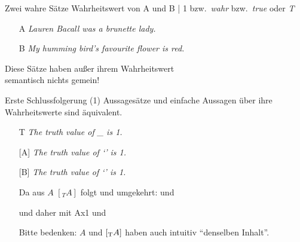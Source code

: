 \begin{frame}
  {Zwei wahre Sätze}
  \onslide<+->
  \onslide<+->
  Wahrheitswert von A und B | \alert{1} bzw.\ \alert{\textit{wahr}} bzw.\ \alert{\textit{true}} oder \alert{\textit{T}}\\
  \Zeile
  \begin{itemize}[<+->]
    \item[A] \textit{Lauren Bacall was a brunette lady.}
    \item[B] \textit{My humming bird's favourite flower is red.} 
  \end{itemize}
  \Doppelzeile
  \onslide<+->
  \centering \alert{\Large Diese Sätze haben außer ihrem Wahrheitswert\\
  semantisch nichts gemein!}
\end{frame}

\begin{frame}
  {Erste Schlussfolgerung}
  \onslide<+->
  \onslide<+->
  (1) Aussagesätze und einfache Aussagen über ihre Wahrheitswerte sind äquivalent.\\
  \Halbzeile
  \begin{itemize}[<+->]
    \item[T] \alert{\textit{The truth value of \_ is 1.}}\\
      \Halbzeile
    \item[{[\Sub{T}A]}] \alert{\textit{The truth value of `' is 1.}}
    \item[{[\Sub{T}B]}] \alert{\textit{The truth value of `' is 1.}}
      \Halbzeile
    \item[ ] Da aus $A$ $[_T A]$ folgt und umgekehrt:  und 
    \item[ ] und daher mit Ax1  und 
      \Halbzeile
    \item[ ] Bitte bedenken: $A$ und $[_{\text{T}}A]$ haben auch intuitiv "`denselben Inhalt"'.
  \end{itemize}
\end{frame}

